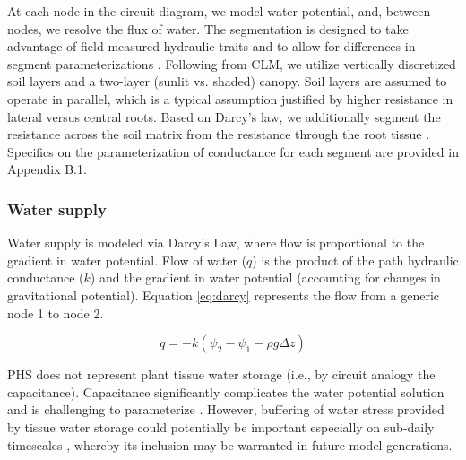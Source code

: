 \documentclass[draft,linenumbers]{agujournal}
\begin{document}
  At each node in the circuit diagram, we model water potential, and, between nodes, we resolve the flux of water.
  The segmentation is designed to take advantage of field-measured hydraulic traits and to allow for differences
  in segment parameterizations \citep{simonin2015, sperry2015}.
  Following from CLM, we utilize vertically discretized soil layers and a two-layer (sunlit vs. shaded) canopy.
  Soil layers are assumed to operate in parallel, which is a typical assumption justified by higher resistance in lateral versus central roots.
  Based on Darcy's law, we additionally segment the resistance across the soil matrix from the resistance through the root tissue \citep{williams1996}. 
  Specifics on the parameterization of conductance for each segment are provided in Appendix B.1.

    \subsubsection{Water supply}
    \label{sect:supply}
    Water supply is modeled via Darcy's Law, where flow is proportional to the gradient in water potential. 
    Flow of water ($q$) is the product of the path hydraulic conductance ($k$) and 
    the gradient in water potential (accounting for changes in gravitational potential). 
    Equation \ref{eq:darcy} represents the flow from a generic node 1 to node 2. 
    
     \begin{linenomath*}
     \begin{equation}
     \label{eq:darcy}
     q = -k\left(\psi_2 - \psi_1 - \rho g \Delta z\right)
     \end{equation}
     \end{linenomath*}
    
    PHS does not represent plant tissue water storage (i.e., by circuit analogy the capacitance). 
    Capacitance significantly complicates the water potential solution \citep{celia1990} and is challenging to parameterize \citep{bartlett2016}.   
     However, buffering of water stress provided by tissue water storage could potentially be important especially on sub-daily timescales \citep{meinzer2009,epila2017}, whereby its inclusion may be warranted in future model generations.
\end{document}
